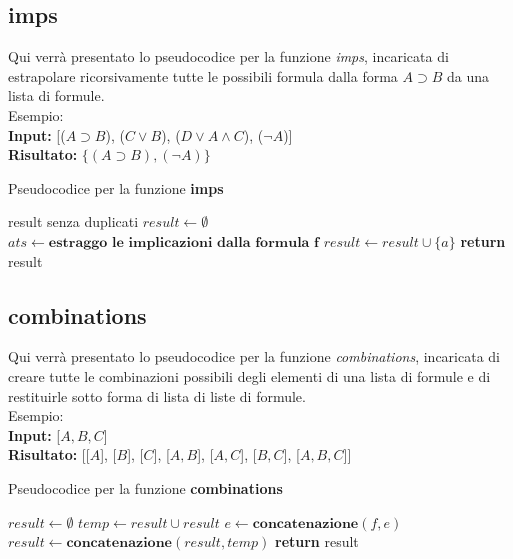 \documentclass[\main/tesi.tex]{subfiles}
\begin{document}
\subsection{imps}
Qui verrà presentato lo pseudocodice per la funzione \textit{imps}, incaricata di estrapolare ricorsivamente tutte le possibili formula dalla forma $A \supset B$ da una lista di formule. \\
Esempio: \\
\textbf{Input:} [($A \supset B$), ($C \lor B$), ($D \lor A \land C$), ($\neg A$)] \\
\textbf{Risultato:} $\{(A \supset B), (\neg A)\}$

\begin{algorithm}
    \caption{Pseudocodice per la funzione \textbf{imps}}\label{alg:imps}
    \begin{algorithmic}
        \Ensure result senza duplicati
        \State $result \gets \emptyset$
        \State $ats \gets \textbf{estraggo le implicazioni dalla formula f}$
        \State $result \gets result \cup \{a\}$
        \EndIf
        \EndFor
        \EndFor
        \State \textbf{return} result
        \EndFunction
    \end{algorithmic}
\end{algorithm}

\newpage

\subsection{combinations}
Qui verrà presentato lo pseudocodice per la funzione \textit{combinations}, incaricata di creare tutte le combinazioni possibili degli elementi di una lista di formule e di restituirle sotto forma di lista di liste di formule. \\
Esempio: \\
\textbf{Input:} [$A, B, C$] \\
\textbf{Risultato:} [[$A$], [$B$], [$C$], [$A, B$], [$A, C$], [$B, C$], [$A, B, C$]]

\begin{algorithm}
    \caption{Pseudocodice per la funzione \textbf{combinations}}\label{alg:combinations}
    \begin{algorithmic}
        \State $result \gets \emptyset$
        \State $temp \gets result \cup result$
        \State $e \gets \textbf{concatenazione}(f, e)$
        \EndFor
        \State $result \gets \textbf{concatenazione}(result, temp)$
        \EndFor
        \State \textbf{return} result
        \EndFunction
    \end{algorithmic}
\end{algorithm}
\end{document}
